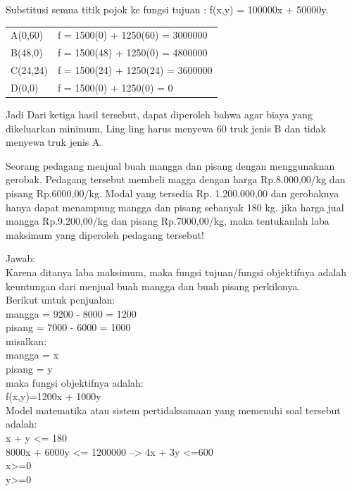 \documentclass[11pt,fleqn]{book} %
\begin{document}
Substitusi semua titik pojok ke fungsi tujuan : f(x,y) = 100000x + 50000y.\\

\begin{tabular}{l l}
A(0,60) & f = 1500(0) + 1250(60) = 3000000 \\
B(48,0) & f = 1500(48) + 1250(0) = 4800000 \\
C(24,24) & f = 1500(24) + 1250(24) = 3600000 \\
D(0,0) & f = 1500(0) + 1250(0) = 0 \\
\end{tabular}


Jadi Dari ketiga hasil tersebut, dapat diperoleh bahwa agar biaya yang dikeluarkan minimum, Ling ling harus menyewa 60 truk jenis B dan tidak menyewa truk jenis A.\\

\begin{example}
Seorang pedagang menjual buah mangga dan pisang dengan menggunaknan gerobak. Pedagang tersebut membeli magga dengan harga Rp.8.000,00/kg dan pisang Rp.6000,00/kg. Modal yang tersedia Rp. 1.200.000,00 dan gerobaknya hanya dapat menampung mangga dan pisang sebanyak 180 kg. jika harga jual mangga Rp.9.200,00/kg dan pisang Rp.7000,00/kg, maka tentukanlah laba maksimum yang diperoleh pedagang tersebut!\\
\end{example}

Jawab:\\
Karena ditanya laba maksimum, maka fungsi tujuan/fungsi objektifnya adalah keuntungan dari menjual buah mangga dan buah pisang perkilonya.\\
Berikut untuk penjualan:\\
mangga = 9200 - 8000 = 1200\\
pisang = 7000 - 6000 = 1000\\

misalkan:\\
mangga = x\\
pisang = y\\

maka fungsi objektifnya adalah:\\
f(x,y)=1200x + 1000y\\

Model matematika atau sistem pertidaksamaan yang memenuhi soal tersebut adalah:\\
x + y <= 180\\
8000x + 6000y <= 1200000 --> 4x + 3y <=600\\
x>=0\\
y>=0\\
\end{document}
